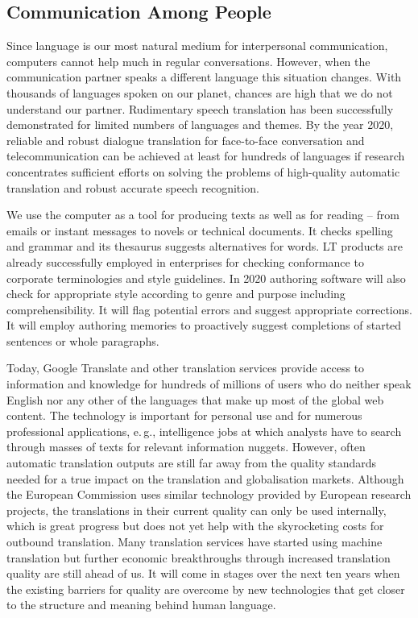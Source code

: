 \documentclass[10pt, plain]{../../metanetpaper}
\begin{document}
\begin{multicols}{2}
\subsection{Communication Among People}
\label{sec:comm-among-people}

Since language is our most natural medium for interpersonal communication, computers cannot help much in regular conversations. However, when the communication partner speaks a different language this situation changes. With thousands of languages spoken on our planet, chances are high that we do not understand our partner. Rudimentary speech translation has been successfully demonstrated for limited numbers of languages and themes. By the year 2020, reliable and robust dialogue translation for face-to-face conversation and telecommunication can be achieved at least for hundreds of languages if research concentrates sufficient efforts on solving the problems of high-quality automatic translation and robust accurate speech recognition. 

 
We use the computer as a tool for producing texts as well as for reading -- from emails or instant messages to novels or technical documents. It checks spelling and grammar and its thesaurus suggests alternatives for words. LT products are already successfully employed in enterprises for checking conformance to corporate terminologies and style guidelines. In 2020 authoring software will also check for appropriate style according to genre and purpose including comprehensibility. It will flag potential errors and suggest appropriate corrections. It will employ authoring memories to proactively suggest completions of started sentences or whole paragraphs.
 
Today, Google Translate and other translation services provide access to information and knowledge for hundreds of millions of users who do neither speak English nor any other of the languages that make up most of the global web content. The technology is important for personal use and for numerous professional applications, e.\,g., intelligence jobs at which analysts have to search through masses of texts for relevant information nuggets. However, often automatic translation outputs are still far away from the quality standards needed for a true impact on the translation and globalisation markets. Although the European Commission uses similar technology provided by European research projects, the translations in their current quality can only be used internally, which is great progress but does not yet help with the skyrocketing costs for outbound translation. Many translation services have started using machine translation but further economic breakthroughs through increased translation quality are still ahead of us. It will come in stages over the next ten years when the existing barriers for quality are overcome by new technologies that get closer to the structure and meaning behind human language.
 

\end{multicols}
\end{document}

